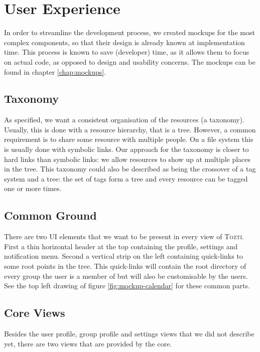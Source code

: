\documentclass[a4paper, english]{report}
\newcommand{\tozti}{\textsc{Tozti}\xspace}
\begin{document}
% 

\section{User Experience}
In order to streamline the development process, we created mockups for the most complex components, so that their design is already known at implementation time. This process is known to save (developer) time, as it allows them to focus on actual code, as opposed to design and usability concerns. The mockups can be found in chapter \ref{chap:mockups}.

\subsection{Taxonomy}
As specified, we want a consistent organisation of the resources (a taxonomy). Usually, this is done with a resource hierarchy, that is a tree. However, a common requirement is to share some resource with multiple people. On a file system this is usually done with symbolic links. Our approach for the taxonomy is closer to hard links than symbolic links: we allow resources to show up at multiple places in the tree. This taxonomy could also be described as being the crossover of a tag system and a tree: the set of tags form a tree and every resource can be tagged one or more times.

\subsection{Common Ground}
There are two UI elements that we want to be present in every view of \tozti. First a thin horizontal header at the top containing the profile, settings and notification menu. Second a vertical strip on the left containing quick-links to some root points in the tree. This quick-links will contain the root directory of every group the user is a member of but will also be customisable by the users. See the top left drawing of figure \ref{fig:mockup-calendar} for these common parts.

\subsection{Core Views}
Besides the user profile, group profile and settings views that we did not describe yet, there are two views that are provided by the core.
\end{document}
